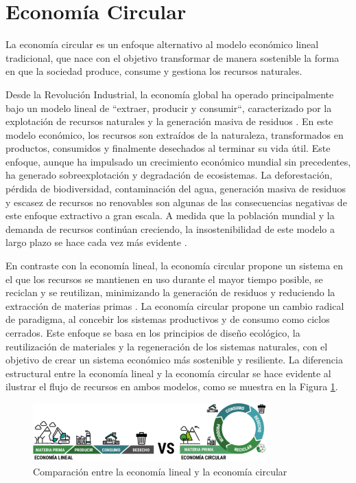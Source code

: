 \section{Economía Circular}
\label{sec:circular-economy}

La economía circular es un enfoque alternativo al modelo económico lineal tradicional, que nace con el objetivo transformar de manera sostenible la forma en que la sociedad produce, consume y gestiona los recursos naturales.

Desde la Revolución Industrial, la economía global ha operado principalmente bajo un modelo lineal de ``extraer, producir y consumir``, caracterizado por la explotación de recursos naturales y la generación masiva de residuos \cite{cerda2016economia}. En este modelo económico, los recursos son extraídos de la naturaleza, transformados en productos, consumidos y finalmente desechados al terminar su vida útil. Este enfoque, aunque ha impulsado un crecimiento económico mundial sin precedentes, ha generado sobreexplotación y degradación de ecosistemas. La deforestación, pérdida de biodiversidad, contaminación del agua, generación masiva de residuos y escasez de recursos no renovables son algunas de las consecuencias negativas de este enfoque extractivo a gran escala. A medida que la población mundial y la demanda de recursos continúan creciendo, la insostenibilidad de este modelo a largo plazo se hace cada vez más evidente \cite{clima2022book}.

En contraste con la economía lineal, la economía circular propone un sistema en el que los recursos se mantienen en uso durante el mayor tiempo posible, se reciclan y se reutilizan, minimizando la generación de residuos y reduciendo la extracción de materias primas \cite{ellenmacarthurfoundation2022}. La economía circular propone un cambio radical de paradigma, al concebir los sistemas productivos y de consumo como ciclos cerrados. Este enfoque se basa en los principios de diseño ecológico, la reutilización de materiales y la regeneración de los sistemas naturales, con el objetivo de crear un sistema económico más sostenible y resiliente. La diferencia estructural entre la economía lineal y la economía circular se hace evidente al ilustrar el flujo de recursos en ambos modelos, como se muestra en la Figura \ref{fig:circular-linear-economy-comparison}.

\begin{figure}[!tb]
    \centering
    \includegraphics[width=0.8\textwidth]{Figures/circular-linear-economy-comparison.png}
    \caption{Comparación entre la economía lineal y la economía circular}
    \label{fig:circular-linear-economy-comparison}
\end{figure}


